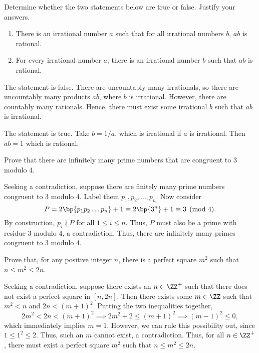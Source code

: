 \begin{problem}
    Determine whether the two statements below are true or false. Justify your answers.

    \begin{enumerate}
        \item There is an irrational number $a$ such that for all irrational numbers $b$, $ab$ is rational.
        \item For every irrational number $a$, there is an irrational number $b$ such that $ab$ is rational.
    \end{enumerate}
\end{problem}
\begin{solution}
    \begin{ppart}
        The statement is false. There are uncountably many irrationals, so there are uncountably many products $ab$, where $b$ is irrational. However, there are countably many rationals. Hence, there must exist some irrational $b$ such that $ab$ is irrational.
    \end{ppart}
    \begin{ppart}
        The statement is true. Take $b = 1/a$, which is irrational if $a$ is irrational. Then $ab = 1$ which is rational.
    \end{ppart}
\end{solution}

\begin{problem}
    Prove that there are infinitely many prime numbers that are congruent to 3 modulo 4.
\end{problem}
\begin{solution}
    Seeking a contradiction, suppose there are finitely many prime numbers congruent to 3 modulo 4. Label them $p_1, p_2, \dots, p_n$. Now consider \[P = 2\bp{p_1p_2\dots p_n} + 1 \equiv 2\bp{3^n} + 1 \equiv 3 \pmod{4}.\] By construction, $p_i \nmid P$ for all $1 \leq i \leq n$. Thus, $P$ must also be a prime with residue 3 modulo 4, a contradiction. Thus, there are infinitely many primes congruent to 3 modulo 4.
\end{solution}

\begin{problem}
    Prove that, for any positive integer $n$, there is a perfect square $m^2$ such that $n \leq m^2 \leq 2n$.
\end{problem}
\begin{solution}
    Seeking a contradiction, suppose there exists an $n \in \ZZ^+$ such that there does not exist a perfect square in $[n, 2n]$. Then there exists some $m \in \ZZ$ such that $m^2 < n$ and $2n < (m+1)^2$. Putting the two inequalities together, \[2m^2 < 2n < (m+1)^2 \implies 2m^2 + 2\leq (m+1)^2 \implies (m-1)^2 \leq 0,\] which immediately implies $m = 1$. However, we can rule this possibility out, since $1 \leq 1^2 \leq 2$. Thus, such an $m$ cannot exist, a contradiction. Thus, for all $n \in \ZZ^+$, there must exist a perfect square $m^2$ such that $n \leq m^2 \leq 2n$.
\end{solution}

